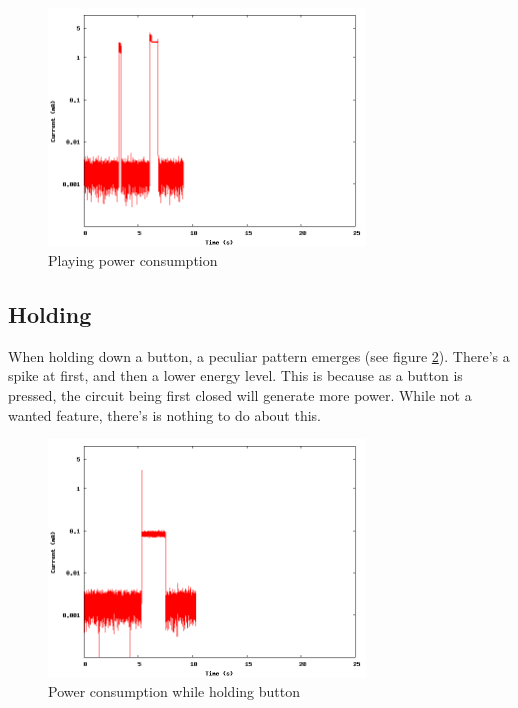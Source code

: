 \begin{figure}[H]
\centering
\includegraphics[width=0.75\textwidth]{data/play.png}
\caption{Playing power consumption}
\label{fig:playpower}
\end{figure}

\subsection{Holding}
When holding down a button, a peculiar pattern emerges (see figure \ref{fig:holdingpower}). 
There's a spike at first, and then a lower energy level.
This is because as a button is pressed, the circuit being first closed will generate more power.
While not a wanted feature, there's is nothing to do about this.

\begin{figure}[H]
\centering
\includegraphics[width=0.75\textwidth]{data/hold.png}
\caption{Power consumption while holding button}
\label{fig:holdingpower}
\end{figure}
